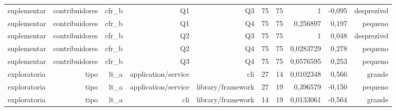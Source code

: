 \begin{tabular}{lrrrrrrrrr}
suplementar & contribuidores & cfr\_b & Q1 & Q3 & 75 & 75 & 1 & -0,095 & desprezível \\
suplementar & contribuidores & cfr\_b & Q1 & Q4 & 75 & 75 & 0,256897 & 0,197 & pequeno \\
suplementar & contribuidores & cfr\_b & Q2 & Q3 & 75 & 75 & 1 & 0,048 & desprezível \\
suplementar & contribuidores & cfr\_b & Q2 & Q4 & 75 & 75 & 0,0283729 & 0,278 & pequeno \\
suplementar & contribuidores & cfr\_b & Q3 & Q4 & 75 & 75 & 0,0576595 & 0,253 & pequeno \\
exploratoria & tipo & lt\_a & application/service & cli & 27 & 14 & 0,0102348 & 0,566 & grande \\
exploratoria & tipo & lt\_a & application/service & library/framework & 27 & 19 & 0,396579 & -0,150 & pequeno \\
exploratoria & tipo & lt\_a & cli & library/framework & 14 & 19 & 0,0133061 & -0,564 & grande \\
\hline
\end{tabular}
